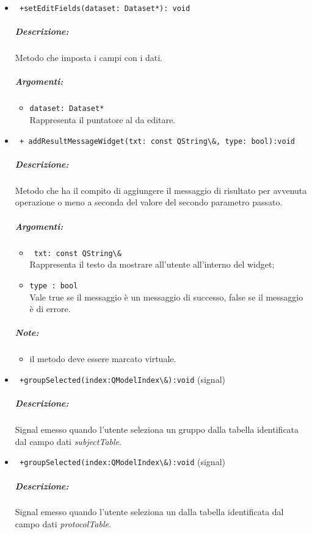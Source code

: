 \begin{itemize}
\item\color{blue}\verb! +setEditFields(dataset: Dataset*): void!
\color{black}
\subparagraph{Descrizione:} Metodo che imposta i campi con i dati.  
 \subparagraph{Argomenti:}
 \begin{itemize}
 \item \color{RoyalPurple} \verb!dataset: Dataset* !\\ Rappresenta il puntatore al \dataset{} da editare.
 \end{itemize} 
 
\item \color{blue} \verb! + addResultMessageWidget(txt: const QString\&, type: bool):void! 
\color{black}
\subparagraph{Descrizione:} Metodo che ha il compito di aggiungere il messaggio di risultato per avvenuta operazione o meno a seconda del valore del secondo parametro passato.
\subparagraph{Argomenti:}
\begin{itemize}
\item \color{RoyalPurple} \verb! txt: const QString\& ! \\Rappresenta il testo da mostrare all'utente all'interno del widget;
\item \color{RoyalPurple} \verb!type : bool ! \\ Vale true se il messaggio è un messaggio di successo, false se il messaggio è di errore.
\end{itemize}
\subparagraph{Note:}
\begin{itemize}
\item il metodo deve essere marcato virtuale.
\end{itemize}


\item\color{blue}\verb! +groupSelected(index:QModelIndex\&):void! (signal)
\color{black} 
\subparagraph{Descrizione:}
Signal\g{} emesso quando l'utente seleziona un gruppo dalla tabella identificata dal campo dati \emph{subjectTable}.
 
\item\color{blue}\verb! +groupSelected(index:QModelIndex\&):void! (signal)
\color{black} 
 \subparagraph{Descrizione:}
Signal\g{} emesso quando l'utente seleziona un \protocol{} dalla tabella identificata dal campo dati \emph{protocolTable}.
 \end{itemize}
\pagebreak
\color{black}
